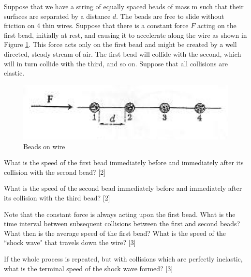 \begin{problem}
    Suppose that we have a string of equally spaced beads of mass m such that their surfaces are separated by a distance $d$. The beads are free to slide without friction on 4 thin wires. Suppose that there is a constant force $F$ acting on the first bead, initially at rest, and causing it to accelerate along the wire as shown in Figure \ref{2011q3}. This force acts only on the first bead and might be created by a well directed, steady stream of air. The first bead will collide with the second, which will in turn collide with the third, and so on. Suppose that all collisions are elastic.
    \begin{figure}[h]
	    \centering
	    \includegraphics[width=0.7\linewidth]{spho_book_TYS_images/2011q3.png}
	    \caption{Beads on wire} \label{2011q3}
    \end{figure}
    \begin{subproblem}
        What is the speed of the first bead immediately before and immediately after its collision with the second bead?
    \hfill{[2]}\end{subproblem}

    \begin{subproblem}
        What is the speed of the second bead immediately before and immediately after its collision with the third bead?
    \hfill{[2]}\end{subproblem}

    \begin{subproblem}
        Note that the constant force is always acting upon the first bead. What is the time interval between subsequent collisions between the first and second beads? What then is the average speed of the first bead? What is the speed of the “shock wave" that travels down the wire?
    \hfill{[3]}\end{subproblem}

    \begin{subproblem}
        If the whole process is repeated, but with collisions which are perfectly inelastic, what is the terminal speed of the shock wave formed?
    \hfill{[3]}\end{subproblem}
\end{problem}

